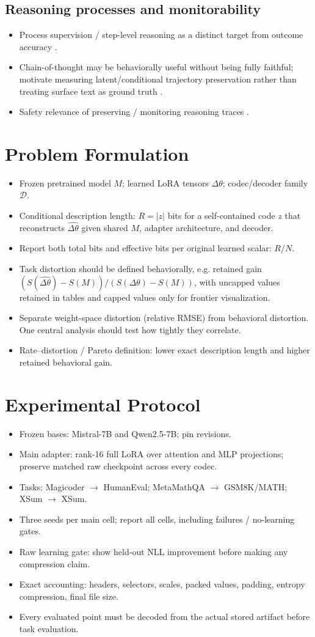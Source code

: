 \documentclass[10pt]{article}
\newcommand{\paperidea}[1]{\item #1}
\begin{document}
\subsection{Reasoning processes and monitorability}
\begin{itemize}
  \paperidea{Process supervision / step-level reasoning as a distinct target from outcome accuracy \citep{lightman2023verify}.}
  \paperidea{Chain-of-thought may be behaviorally useful without being fully faithful; motivate measuring latent/conditional trajectory preservation rather than treating surface text as ground truth \citep{lyu2023faithful}.}
  \paperidea{Safety relevance of preserving / monitoring reasoning traces \citep{korbak2025monitorability}.}
\end{itemize}

\section{Problem Formulation}
\begin{itemize}
  \paperidea{Frozen pretrained model $M$; learned LoRA tensors $\Delta\theta$; codec/decoder family $\mathcal D$.}
  \paperidea{Conditional description length: $R = |z|$ bits for a self-contained code $z$ that reconstructs $\widehat{\Delta\theta}$ given shared $M$, adapter architecture, and decoder.}
  \paperidea{Report both total bits and effective bits per original learned scalar: $R/N$.}
  \paperidea{Task distortion should be defined behaviorally, e.g. retained gain $(S(\widehat{\Delta\theta})-S(M))/(S(\Delta\theta)-S(M))$, with uncapped values retained in tables and capped values only for frontier visualization.}
  \paperidea{Separate weight-space distortion (relative RMSE) from behavioral distortion. One central analysis should test how tightly they correlate.}
  \paperidea{Rate--distortion / Pareto definition: lower exact description length and higher retained behavioral gain.}
\end{itemize}

\section{Experimental Protocol}
\begin{itemize}
  \paperidea{Frozen bases: Mistral-7B and Qwen2.5-7B; pin revisions.}
  \paperidea{Main adapter: rank-16 full LoRA over attention and MLP projections; preserve matched raw checkpoint across every codec.}
  \paperidea{Tasks: Magicoder $\rightarrow$ HumanEval; MetaMathQA $\rightarrow$ GSM8K/MATH; XSum $\rightarrow$ XSum.}
  \paperidea{Three seeds per main cell; report all cells, including failures / no-learning gates.}
  \paperidea{Raw learning gate: show held-out NLL improvement before making any compression claim.}
  \paperidea{Exact accounting: headers, selectors, scales, packed values, padding, entropy compression, final file size.}
  \paperidea{Every evaluated point must be decoded from the actual stored artifact before task evaluation.}
\end{itemize}
\end{document}
